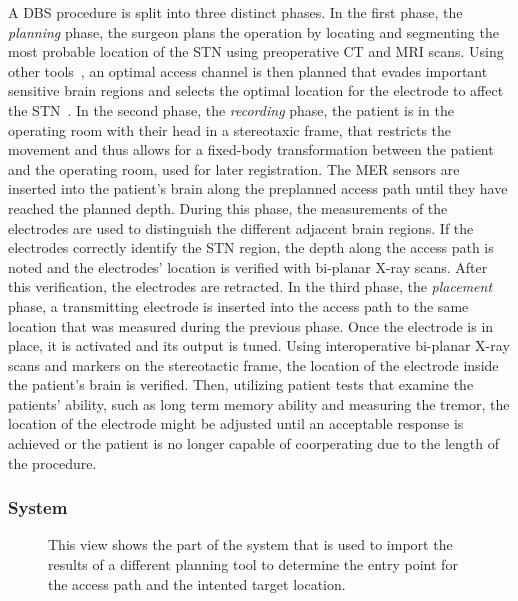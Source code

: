 A DBS procedure is split into three distinct phases. In the first phase, the \emph{planning} phase, the surgeon plans the operation by locating and segmenting the most probable location of the STN using preoperative CT and MRI scans. Using other tools~\cite{Shamir2010}, an optimal access channel is then planned that evades important sensitive brain regions and selects the optimal location for the electrode to affect the STN~\cite{butson2007patient}. In the second phase, the \emph{recording} phase, the patient is in the operating room with their head in a stereotaxic frame, that restricts the movement and thus allows for a fixed-body transformation between the patient and the operating room, used for later registration. The MER sensors are inserted into the patient's brain along the preplanned access path until they have reached the planned depth. During this phase, the measurements of the electrodes are used to distinguish the different adjacent brain regions. If the electrodes correctly identify the STN region, the depth along the access path is noted and the electrodes' location is verified with bi-planar X-ray scans. After this verification, the electrodes are retracted. In the third phase, the \emph{placement} phase, a transmitting electrode is inserted into the access path to the same location that was measured during the previous phase. Once the electrode is in place, it is activated and its output is tuned. Using interoperative bi-planar X-ray scans and markers on the stereotactic frame, the location of the electrode inside the patient's brain is verified. Then, utilizing patient tests that examine the patients' ability, such as long term memory ability and measuring the tremor, the location of the electrode might be adjusted until an acceptable response is achieved or the patient is no longer capable of coorperating due to the length of the procedure.

\subsubsection{System}
\label{contributions:medbio:dbs:system}
\begin{figure}
\caption{This view shows the part of the system that is used to import the results of a different planning tool to determine the entry point for the access path and the intented target location.}
\label{contributions:medbio:dbs:planning}
\end{figure}

